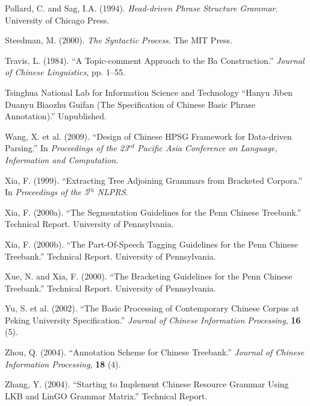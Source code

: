\documentclass[english]{jnlp_1.4}
\begin{document}
\begin{thebibliography}{}
\item
Pollard, C. and Sag, I.A. (1994). \textit{Head-driven Phrase Structure Grammar}. 
University of Chicago Press.

\item
Steedman, M. (2000). \textit{The Syntactic Process}. The MIT Press.

\item
Travis, L. (1984). ``A Topic-comment Approach to the Ba Construction.'' 
\textit{Journal of Chinese Linguistics}, pp. 1--55.

\item
Tsinghua National Lab for Information Science and Technology ``Hanyu Jiben 
Duanyu Biaozhu Guifan (The Specification of Chinese Basic Phrase 
Annotation).'' Unpublished.

\item
Wang, X. et al. (2009). ``Design of Chinese HPSG Framework for Data-driven 
Parsing.'' In \textit{Proceedings of the 23}$^{rd}$\textit{ Pacific Asia Conference on Language, Information and Computation}.

\item
Xia, F. (1999). ``Extracting Tree Adjoining Grammars from Bracketed 
Corpora.'' In \textit{Proceedings of the 5}$^{th}$\textit{ NLPRS}.

\item
Xia, F. (2000a). ``The Segmentation Guidelines for the Penn Chinese 
Treebank.'' Technical Report. University of Pennsylvania.

\item
Xia, F. (2000b). ``The Part-Of-Speech Tagging Guidelines for the Penn 
Chinese Treebank.'' Technical Report. University of Pennsylvania.

\item
Xue, N. and Xia, F. (2000). ``The Bracketing Guidelines for the Penn Chinese 
Treebank.'' Technical Report. University of Pennsylvania.

\item
Yu, S. et al. (2002). ``The Basic Processing of Contemporary Chinese Corpus 
at Peking University Specification.'' \textit{Journal of Chinese Information Processing}, \textbf{16} (5).

\item
Zhou, Q. (2004). ``Annotation Scheme for Chinese Treebank.'' \textit{Journal of Chinese Information Processing}, \textbf{18} (4).

\item
Zhang, Y. (2004). ``Starting to Implement Chinese Resource Grammar Using LKB 
and LinGO Grammar Matrix.'' Technical Report.

\end{thebibliography}
\end{document}
